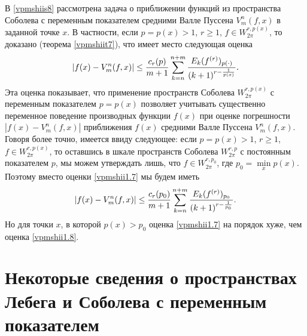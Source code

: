  В \ref{vpmshiis8} рассмотрена  задача о приближении функций из пространства Соболева с переменным показателем средними Валле Пуссена $V_m^n(f,x)$  в заданной точке $x$.  В частности, если  $p=p(x)>1$, $r\ge1$, $f\in W^{r,p(x)}_{2\pi}$, то доказано (теорема \ref{vpmshiit7}), что имеет место следующая оценка
 \begin{equation}\label{vpmshii1.7}
    |f(x)-V_m^n(f,x)|\le \frac{c_r(p)}{m+1}\sum_{k=n}^{n+m}{E_k(f^{(r)})_{p(\cdot)}\over (k+1)^{r-{\frac{1}{p(x)}}}}.
 \end{equation}
Эта оценка показывает, что применение пространств Соболева  $W^{r,p(x)}_{2\pi}$ с переменным показателем $p=p(x)$ позволяет учитывать существенно переменное поведение производных функции  $f(x)$  при оценке погрешности $|f(x)-V_m^n(f,x)|$ приближения  $f(x)$ средними Валле Пуссена $V_m^n(f,x)$. Говоря более точно, имеется ввиду следующее: если $p=p(x)>1$, $r\ge1$, $f\in W^{r,p(x)}_{2\pi}$, то оставшись в шкале пространств Соболева $W^{r,p}_{2\pi}$ с постоянным показателем $p$, мы можем утверждать лишь, что  $f\in W^{r,p_0}_{2\pi}$, где $p_0=\min\limits_x p(x)$. Поэтому вместо оценки \eqref{vpmshii1.7} мы будем иметь
\begin{equation}\label{vpmshii1.8}
    |f(x)-V_m^n(f,x)|\le \frac{c_r(p_0)}{m+1}\sum_{k=n}^{n+m}{E_k(f^{(r)})_{p_0}\over (k+1)^{r-{\frac{1}{p_0}}}}.
 \end{equation}
Но для точки $x$, в которой $p(x)>p_0$ оценка \eqref{vpmshii1.7} на порядок хуже, чем оценка \eqref{vpmshii1.8}.









\section{ Некоторые сведения о пространствах Лебега и Соболева с переменным показателем}\label{vpmshiis2}

